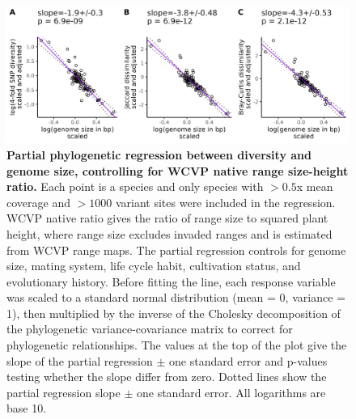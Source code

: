 \documentclass[12pt]{article}
\begin{document}
\begin{figure}[H]
    \centering
    \includegraphics[width=\textwidth]{figures/appendix_d/pi_jac_bcd_vs_genome_size_wcvp-native-corrected_2024-12-12.jpg}
    \caption{\textbf{Partial phylogenetic regression between diversity and genome size, controlling for WCVP native range size-height ratio.} Each point is a species and only species with $>0.5$x mean coverage and $>1000$ variant sites were included in the regression. WCVP native ratio gives the ratio of range size to squared plant height, where range size excludes invaded ranges and is estimated from WCVP range maps. The partial regression controls for genome size, mating system, life cycle habit, cultivation status, and evolutionary history. Before fitting the line, each response variable was scaled to a standard normal distribution (mean = 0, variance = 1), then multiplied by the inverse of the Cholesky decomposition of the phylogenetic variance-covariance matrix to correct for phylogenetic relationships. The values at the top of the plot give the slope of the partial regression $\pm$ one standard error and p-values testing whether the slope differ from zero. Dotted lines show the partial regression slope $\pm$ one standard error. All logarithms are base 10.}
\end{figure}
\end{document}
